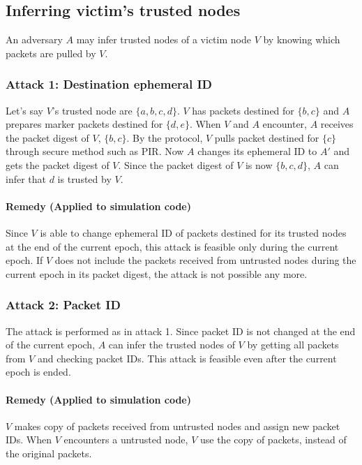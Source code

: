 \documentclass[11pt]{article}
\begin{document}
\subsection{Inferring victim's trusted nodes}
An adversary $A$ may infer trusted nodes of a victim node $V$ by knowing which packets are pulled by $V$. 


\subsubsection{Attack 1: Destination ephemeral ID}
Let's say $V$'s trusted node are $\{a, b, c, d\}$. 
$V$ has packets destined for $\{b, c\}$ and $A$ prepares marker packets destined for $\{d, e\}$. 
When $V$ and $A$ encounter, $A$ receives the packet digest of $V$, $\{b, c\}$.  
By the protocol, $V$ pulls packet destined for $\{c\}$ through secure method such as PIR. 
Now $A$ changes its ephemeral ID to $A'$ and gets the packet digest of $V$. 
Since the packet digest of $V$ is now $\{b, c, d\}$, $A$ can infer that $d$ is trusted by $V$. 

\paragraph{Remedy (Applied to simulation code)}
Since $V$ is able to change ephemeral ID of packets destined for its trusted nodes at the end of the current epoch, this attack is feasible only during the current epoch. 
If $V$ does not include the packets received from untrusted nodes during the current epoch in its packet digest, the attack is not possible any more. 



\subsubsection{Attack 2: Packet ID}
The attack is performed as in attack 1. 
Since packet ID is not changed at the end of the current epoch, $A$ can infer the trusted nodes of $V$ by getting all packets from $V$ and checking packet IDs. 
This attack is feasible even after the current epoch is ended.  


\paragraph{Remedy (Applied to simulation code)}
$V$ makes copy of packets received from untrusted nodes and assign new packet IDs. 
When $V$ encounters a untrusted node, $V$ use the copy of packets, instead of the original packets. 
\end{document}
